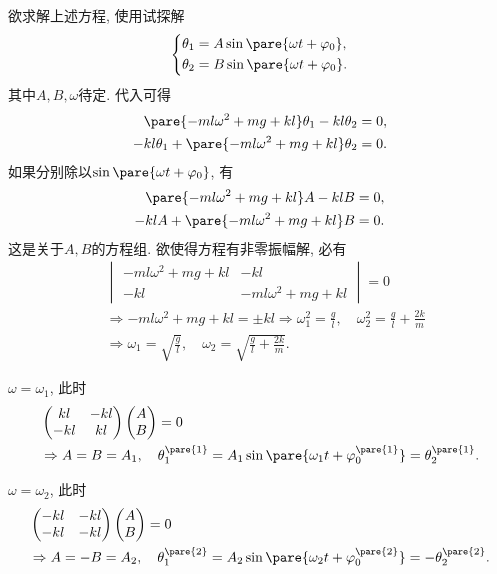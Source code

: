 \documentclass[../LectureNotes.tex]{subfiles}
\begin{document}
欲求解上述方程, 使用试探解
\[ \left\{\begin{aligned}
    \theta_1 &= A\sin\pare{\omega t + \varphi_0}, \\
    \theta_2 &= B\sin\pare{\omega t + \varphi_0}.
\end{aligned}\right. \]
其中$A,B,\omega$待定. 代入可得
\begin{align*}
    \pare{-ml\omega^2+mg+kl} \theta_1 - kl\theta_2 &= 0, \\
    -kl\theta_1 + \pare{-ml\omega^2 + mg + kl}\theta_2 &= 0.
\end{align*}
如果分别除以$\sin\pare{\omega t + \varphi_0}$, 有
\begin{align*}
    \pare{-ml\omega^2+mg+kl} A - kl B &= 0, \\
    -klA + \pare{-ml\omega^2 + mg + kl} B &= 0.
\end{align*}
这是关于$A, B$的方程组. 欲使得方程有非零振幅解, 必有
\begin{align*}
    & \begin{vmatrix}
    {-ml\omega^2+mg+kl} & - kl \\
    -kl & {-ml\omega^2 + mg + kl}
\end{vmatrix} = 0 \\ &\Rightarrow {-ml\omega^2+mg+kl} = \pm kl \Rightarrow \omega_1^2 = \frac{g}{l},\quad \omega_2^2 = \frac{g}{l}+\frac{2k}{m} \\
&\Rightarrow \omega_1 = \sqrt{\frac{g}{l}},\quad \omega_2 = \sqrt{\frac{g}{l} + \frac{2k}{m}}.
\end{align*}
\begin{cenum}
    \item $\omega = \omega_1$, 此时
    \begin{align*}
        & \begin{pmatrix}
        kl & -kl \\ -kl & kl
    \end{pmatrix} \begin{pmatrix}
        A \\ B
    \end{pmatrix} = 0 \\ &\Rightarrow A = B = A_1,\quad \theta_1^{\pare{1}} = A_1\sin\pare{\omega_1 t + \varphi_0^{\pare{1}}} = \theta_2^{\pare{1}}.
    \end{align*}
    \item $\omega = \omega_2$, 此时
    \begin{align*}
        & \begin{pmatrix}
        -kl & -kl \\
        -kl & -kl
    \end{pmatrix} \begin{pmatrix}
        A \\ B
    \end{pmatrix} = 0 \\ &\Rightarrow A = -B = A_2,\quad \theta_1^{\pare{2}} = A_2\sin\pare{\omega_2 t + \varphi_0^{\pare{2}}} = -\theta_2^{\pare{2}}.
    \end{align*}
\end{cenum}
\end{document}
